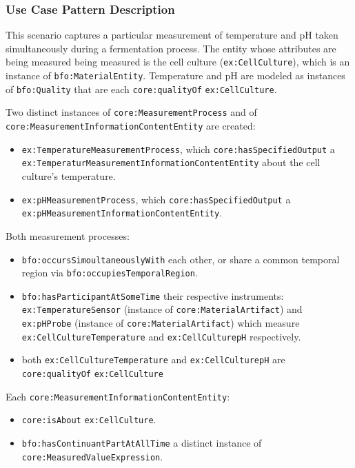 \subsubsection*{Use Case Pattern Description}

This scenario captures a particular measurement of temperature and pH taken simultaneously during a fermentation process. The entity whose attributes are being measured being measured is the cell culture (\texttt{ex:CellCulture}), which is an instance of \texttt{bfo:MaterialEntity}. Temperature and pH are modeled as instances of \texttt{bfo:Quality} that are each \texttt{core:qualityOf} \texttt{ex:CellCulture}.

Two distinct instances of \texttt{core:MeasurementProcess} and of \texttt{core:MeasurementInformationContentEntity}  are created:

\begin{itemize}
    \item \texttt{ex:TemperatureMeasurementProcess}, which \texttt{core:hasSpecifiedOutput} a \texttt{ex:TemperaturMeasurementInformationContentEntity} about the cell culture's temperature.
    \item \texttt{ex:pHMeasurementProcess}, which \texttt{core:hasSpecifiedOutput} a \texttt{ex:pHMeasurementInformationContentEntity}.
\end{itemize}

Both measurement processes:

\begin{itemize}
    \item \texttt{bfo:occursSimoultaneouslyWith} each other, or share a common temporal region via \texttt{bfo:occupiesTemporalRegion}.
    \item \texttt{bfo:hasParticipantAtSomeTime} their respective instruments: \texttt{ex:TemperatureSensor} (instance of \texttt{core:MaterialArtifact}) and \texttt{ex:pHProbe} (instance of \texttt{core:MaterialArtifact}) which measure  \texttt{ex:CellCultureTemperature} and \texttt{ex:CellCulturepH} respectively.
    \item both \texttt{ex:CellCultureTemperature} and \texttt{ex:CellCulturepH} are \texttt{core:qualityOf} \texttt{ex:CellCulture} 
\end{itemize}

Each \texttt{core:MeasurementInformationContentEntity}:

\begin{itemize}
    \item \texttt{core:isAbout} \texttt{ex:CellCulture}.
    \item \texttt{bfo:hasContinuantPartAtAllTime} a distinct instance of \texttt{core:MeasuredValueExpression}.
\end{itemize}

